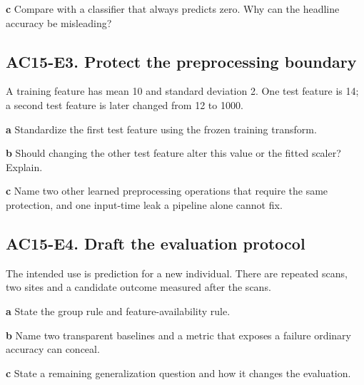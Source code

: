 \documentclass[11pt,letterpaper]{article}
\theoremstyle{definition}\newtheorem{definition}{Definition}\newtheorem{example}{Example}
\numberwithin{equation}{section}
\begin{document}
\textbf{c} Compare with a classifier that always predicts zero. Why can the headline accuracy be misleading?

\par\noindent\begin{minipage}{\linewidth}
\subsection*{AC15-E3. Protect the preprocessing boundary}
A training feature has mean 10 and standard deviation 2. One test feature is 14; a second test feature is later changed from 12 to 1000.

\textbf{a} Standardize the first test feature using the frozen training transform.

\end{minipage}\par\medskip
\textbf{b} Should changing the other test feature alter this value or the fitted scaler? Explain.

\textbf{c} Name two other learned preprocessing operations that require the same protection, and one input-time leak a pipeline alone cannot fix.

\par\noindent\begin{minipage}{\linewidth}
\subsection*{AC15-E4. Draft the evaluation protocol}
The intended use is prediction for a new individual. There are repeated scans, two sites and a candidate outcome measured after the scans.

\textbf{a} State the group rule and feature-availability rule.

\end{minipage}\par\medskip
\textbf{b} Name two transparent baselines and a metric that exposes a failure ordinary accuracy can conceal.

\textbf{c} State a remaining generalization question and how it changes the evaluation.
\end{document}
